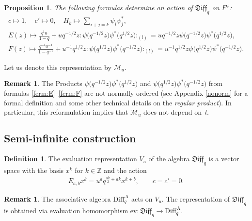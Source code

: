 \documentclass[11pt]{article}
\numberwithin{equation}{section}
\newtheorem{Proposition}[Theorem]{Proposition}
\theoremstyle{definition}
\newtheorem{Remark}[Theorem]{Remark}
\newtheorem{Definition}[Theorem]{Definition}
\newcommand{\qaD}{\mathrm{Diff}_q^{\, \mathrm{A}}}
\newcommand{\qD}{\mathfrak{Diff}_q}
\begin{document}
\begin{Proposition} \label{prop: level 1 Fermion}
The following formulas determine an action of $\qD$ on $F^{\psi}$:
\begin{gather}
c \mapsto 1, \quad c' \mapsto 0, \quad H_k \mapsto \sum_{i+j=k} \psi_i \psi_j^*, \label{eq:centerFermi} \\
E(z) \mapsto \frac{q^{l} u }{1-q} + u q^{ - 1/2 }z : \! \psi\big( q^{-1/2} z\big) \psi^* \big( q^{1/2} z\big) \! :_{(l)} = u q^{-1/2} z \psi\big( q^{-1/2} z\big) \psi^* \big( q^{1/2} z\big), \label{ferm:E} \\
F(z) \mapsto \frac{q^{-l} u^{-1} }{1-q^{-1}} + u^{-1} q^{1/2} z : \! \psi\big( q^{1/2} z\big) \psi^* \big(q^{-1/2} z\big)\!:_{(l)}= u^{-1} q^{1/2} z \psi\big( q^{1/2} z\big) \psi^* \big(q^{-1/2} z\big). \!\!\!\label{ferm:F}
\end{gather}
\end{Proposition}

Let us denote this representation by $\mathcal{M}_u$.

\begin{Remark}The Products $\psi\big( q^{-1/2} z\big) \psi^* \big( q^{1/2} z\big)$ and $\psi\big( q^{1/2} z\big) \psi^* \big(q^{-1/2} z\big)$ from formulas \eqref{ferm:E}--\eqref{ferm:F} are not normally ordered (see Appendix \ref{nonorm} for a formal definition and some other technical details on the \emph{regular product}). In particular, this reformulation implies that $\mathcal{M}_u$ does not depend on~$l$.
\end{Remark}

\setcounter{section}{3}
\setcounter{subsection}{2}
\setcounter{subsubsection}{0}
\setcounter{Theorem}{7}
\setcounter{equation}{10}
\subsection{Semi-infinite construction}

\begin{Definition} \label{eq: sec3 eval def}The evaluation representation $V_{u}$ of the algebra $\qD$ is a vector space with the basis $x^{k}$ for $k \in \mathbb{Z}$ and the action
\begin{gather*}
E_{a,b} x^{k} = u^a q^{\frac{ab}{2} + ak} x^{k+b}, \qquad c=c'=0.
\end{gather*}
\end{Definition}

\begin{Remark}The associative algebra $\qaD$ acts on $V_u$. The representation of $\qD$ is obtained via evaluation homomorphism $\mathrm{ev}\colon \qD \rightarrow \qaD$.
\end{Remark}
\end{document}
